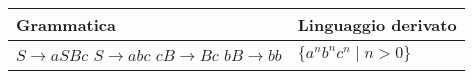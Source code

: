 \documentclass{standalone}
\begin{document}
\begin{tabularx}{\textwidth}{XX}
		Grammatica & Linguaggio derivato \\
    \midrule
        $S \to aSBc$ \newline
        $S \to abc$ \newline
        $cB \to Bc$ \newline
        $bB \to bb$
        & 
        $\{a^nb^nc^n \mid n>0\}$
\end{tabularx}
\end{document}
